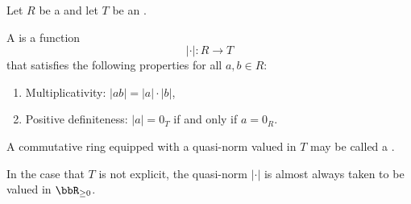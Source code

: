 \begin{definition} \label{definition:quasi_norm_on_a_commutative_ring_valued_in_an_ordered_semiring}
Let $R$ be a  and let $T$ be an .

A  is a function
$$
| \cdot | : R \to T
$$
that satisfies the following properties for all $a, b \in R$:
\begin{enumerate}
    \item Multiplicativity: $|ab| = |a| \cdot |b|$,
    \item Positive definiteness: $|a| = 0_T$ if and only if $a = 0_R$.
\end{enumerate}
A commutative ring equipped with a quasi-norm valued in $T$ may be called a .

In the case that $T$ is not explicit, the quasi-norm $|\cdot|$ is almost always taken to be valued in $\bbR_{\geq 0}$.
\end{definition}